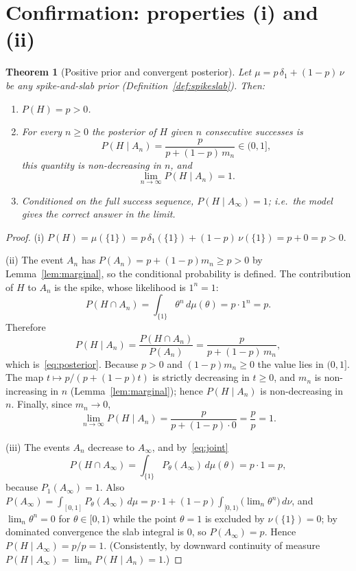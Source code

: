 \documentclass{amsart}
\newtheorem{theorem}{Theorem}
\theoremstyle{definition}
\begin{document}
\section{Confirmation: properties (i) and (ii)}\label{sec:confirm}

\begin{theorem}[Positive prior and convergent posterior]\label{thm:main}
Let $\mu=p\,\delta_1+(1-p)\,\nu$ be any spike-and-slab prior
(Definition~\ref{def:spikeslab}). Then:
\begin{enumerate}
\item[\textup{(i)}] $P(H)=p>0$.
\item[\textup{(ii)}] For every $n\ge0$ the posterior of $H$ given $n$ consecutive
successes is
\begin{equation}\label{eq:posterior}
  P(H\mid A_n)=\frac{p}{p+(1-p)\,m_n}\in(0,1],
\end{equation}
this quantity is non-decreasing in $n$, and
\[
  \lim_{n\to\infty}P(H\mid A_n)=1.
\]
\item[\textup{(iii)}] Conditioned on the full success sequence,
$P(H\mid A_\infty)=1$; i.e.\ the model gives the correct answer in the limit.
\end{enumerate}
\end{theorem}

\begin{proof}
(i) $P(H)=\mu(\{1\})=p\,\delta_1(\{1\})+(1-p)\,\nu(\{1\})=p+0=p>0$.

(ii) The event $A_n$ has $P(A_n)=p+(1-p)m_n\ge p>0$ by
Lemma~\ref{lem:marginal}, so the conditional probability is defined. The
contribution of $H$ to $A_n$ is the spike, whose likelihood is $1^n=1$:
\[
  P(H\cap A_n)=\int_{\{1\}}\theta^n\,d\mu(\theta)=p\cdot 1^n=p .
\]
Therefore
\[
  P(H\mid A_n)=\frac{P(H\cap A_n)}{P(A_n)}=\frac{p}{p+(1-p)\,m_n},
\]
which is~\eqref{eq:posterior}. Because $p>0$ and $(1-p)m_n\ge0$ the value lies
in $(0,1]$. The map $t\mapsto p/(p+(1-p)t)$ is strictly decreasing in
$t\ge0$, and $m_n$ is non-increasing in $n$ (Lemma~\ref{lem:marginal}); hence
$P(H\mid A_n)$ is non-decreasing in $n$. Finally, since $m_n\to0$,
\[
  \lim_{n\to\infty}P(H\mid A_n)=\frac{p}{p+(1-p)\cdot 0}=\frac{p}{p}=1 .
\]

(iii) The events $A_n$ decrease to $A_\infty$, and by~\eqref{eq:joint}
\[
  P(H\cap A_\infty)=\int_{\{1\}}P_\theta(A_\infty)\,d\mu(\theta)=p\cdot 1=p,
\]
because $P_1(A_\infty)=1$. Also
$P(A_\infty)=\int_{[0,1]}P_\theta(A_\infty)\,d\mu
=p\cdot1+(1-p)\int_{[0,1)}\big(\lim_n\theta^n\big)\,d\nu$, and
$\lim_n\theta^n=0$ for $\theta\in[0,1)$ while the point $\theta=1$ is
excluded by $\nu(\{1\})=0$; by dominated convergence the slab integral is $0$, so
$P(A_\infty)=p$. Hence $P(H\mid A_\infty)=p/p=1$. (Consistently, by downward
continuity of measure $P(H\mid A_\infty)=\lim_n P(H\mid A_n)=1$.)
\end{proof}
\end{document}
